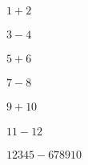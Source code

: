 \documentclass{article}
\begin{document}
\hspace{2mm} \\
$ 1 + 2 $ \\ \\
$ 3 - 4 $ \\ \\
$ 5 + 6 $ \\ \\
$ 7 - 8 $ \\ \\
$ 9 + 10 $ \\ \\
$ 11 - 12 $  \\ \\
$ 12345 - 678910 $
\end{document}
